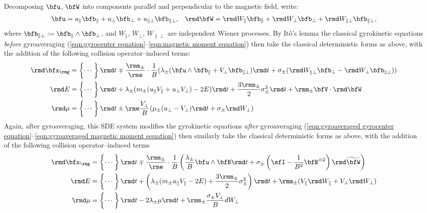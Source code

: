     Decomposing $\bfu$, $\bfW$ into components parallel and perpendicular to the magnetic field, write:
    \begin{align}
        \bfu  =  u_{\parallel}\bfb_{\parallel} + u_{\perp}\bfb_{\perp} + u_{\parallel\perp}\bfb_{\parallel\perp},  &&
        \rmd\bfW  =  \rmd W_{\parallel}\bfb_{\parallel} + \rmd W_{\perp}\bfb_{\perp} + \rmd W_{\parallel\perp}\bfb_{\parallel\perp},
    \end{align}
    where $\bfb_{\parallel\perp}  :=  \bfb_{\parallel}\wedge\bfb_{\perp}$, and $W_{\parallel}$, $W_{\perp}$, $W_{\parallel\perp}$ are independent Wiener processes. By Itô's lemma \cite{Le-Gall_2016} the classical gyrokinetic equations \emph{before} gyroaveraging (\ref{eqn:gyrocenter equation}--\ref{eqn:magnetic moment equation}) then take the classical deterministic forms as above, with the addition of the following collision operator--induced terms:
    \begin{align}
        \rmd\bfx_{\rmg}  &=  \left\{\cdots\tall\right\}\rmd t \mp \frac{\rmm_{\pm}}{\rme}\cdot\frac{1}{B}(\lambda_{\pm}(\bfu\wedge\bfb_{\parallel} + V_{\perp}\bfb_{\parallel\perp})\rmd t + \sigma_{\pm}(\rmd W_{\parallel\perp}\bfb_{\perp} - \rmd W_{\perp}\bfb_{\parallel\perp}))   \\
                 \rmd E  &=  \left\{\cdots\tall\right\}\rmd t + \lambda_{\pm}(m_{\pm}(u_{\parallel}V_{\parallel} + u_{\perp}V_{\perp}) - 2E)\rmd t + \frac{3\rmm_{\pm}}{2}\sigma_{\pm}^{2}\rmd t + \rmm_{\pm}\bfV\cdot\rmd\bfW  \\
                \rmd\mu  &=  \left\{\cdots\tall\right\}\rmd t \pm \rme\frac{V_{\perp}}{B}(\mu_{\pm}(u_{\perp} - V_{\perp})\rmd t + \sigma_{\pm}\rmd W_{\perp})
    \end{align}
    Again, after gyroaveraging, this SDE system modifies the gyrokinetic equations \emph{after} gyroaveraging (\ref{eqn:gyroaveraged gyrocenter equation}--\ref{eqn:gyroaveraged magnetic moment equation}) then similarly take the classical deterministic forms as above, with the addition of the following collision operator--induced terms
    \begin{align}
        \rmd\bfx_{\rmg}  &=  \left\{\cdots\tall\right\}\rmd t \mp \frac{\rmm_{\pm}}{\rme}\cdot\frac{1}{B}\left(\frac{\lambda_{\pm}}{B}\bfu\wedge\bfB\rmd t + \sigma_{\pm}\left(\sfI - \frac{1}{B^{2}}\bfB^{\otimes 2}\right)\rmd\widetilde{\bfW}\right)   \\
                 \rmd E  &=  \left\{\cdots\tall\right\}\rmd t + \left(\lambda_{\pm}(m_{\pm}u_{\parallel}V_{\parallel} - 2E) + \frac{3\rmm_{\pm}}{2}\sigma_{\pm}^{2}\right)\rmd t + \rmm_{\pm}(V_{\parallel}\rmd W_{\parallel} + V_{\perp}\rmd W_{\perp})  \\
                \rmd\mu  &=  \left\{\cdots\tall\right\}\rmd t - 2\lambda_{\pm}\mu\rmd t + \rmm_{\pm}\frac{\sigma_{\pm}V_{\perp}}{B}dW_{\perp}
    \end{align}
